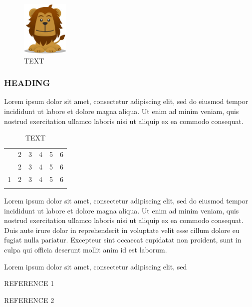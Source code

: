 \documentclass[hvmath, online]{copernicus_discussions}
\begin{document}
\begin{figure}[h!]
\centering
\includegraphics[width=0.2\textwidth]{logo.png}
\caption{TEXT}
\end{figure}


\subsubsection{HEADING}
Lorem ipsum dolor sit amet, consectetur adipiscing elit, sed do eiusmod tempor incididunt ut labore et dolore magna aliqua. Ut enim ad minim veniam, quis nostrud exercitation ullamco laboris nisi ut aliquip ex ea commodo consequat. 

\begin{table}[h!]
\caption{TEXT}
\vskip4mm
\centering
\begin{tabular}{lcrlcr}
\tophline
1 & 2 & 3 & 4 & 5 & 6\\
\middlehline
1 & 2 & 3 & 4 & 5 & 6\\
1 & 2 & 3 & 4 & 5 & 6\\
\bottomhline
\end{tabular}
\end{table}


Lorem ipsum dolor sit amet, consectetur adipiscing elit, sed do eiusmod tempor incididunt ut labore et dolore magna aliqua. Ut enim ad minim veniam, quis nostrud exercitation ullamco laboris nisi ut aliquip ex ea commodo consequat. Duis aute irure dolor in reprehenderit in voluptate velit esse cillum dolore eu fugiat nulla pariatur. Excepteur sint occaecat cupidatat non proident, sunt in culpa qui officia deserunt mollit anim id est laborum.



\begin{acknowledgements}
Lorem ipsum dolor sit amet, consectetur adipiscing elit, sed
\end{acknowledgements}



\begin{thebibliography}{}

REFERENCE 1

REFERENCE 2

\end{thebibliography}
\end{document}
